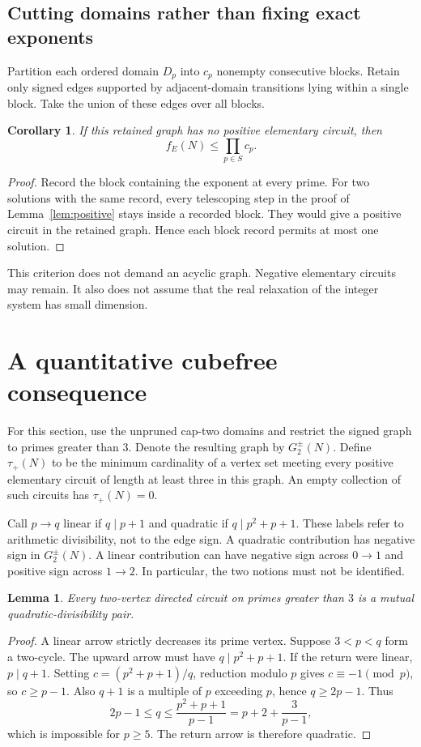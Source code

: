 \documentclass[11pt]{article}
\newtheorem{lemma}[theorem]{Lemma}
\newtheorem{corollary}[theorem]{Corollary}
\begin{document}
\subsection*{Cutting domains rather than fixing exact exponents}
Partition each ordered domain $D_p$ into $c_p$ nonempty consecutive blocks. Retain only signed edges supported by adjacent-domain transitions lying within a single block. Take the union of these edges over all blocks.

\begin{corollary}\label{cor:cuts}
If this retained graph has no positive elementary circuit, then
\[
 \boxed{f_E(N)\le\prod_{p\in S}c_p.}
\]
\end{corollary}
\begin{proof}
Record the block containing the exponent at every prime. For two solutions with the same record, every telescoping step in the proof of Lemma~\ref{lem:positive} stays inside a recorded block. They would give a positive circuit in the retained graph. Hence each block record permits at most one solution.
\end{proof}

This criterion does not demand an acyclic graph. Negative elementary circuits may remain. It also does not assume that the real relaxation of the integer system has small dimension.

\section{A quantitative cubefree consequence}
For this section, use the unpruned cap-two domains and restrict the signed graph to primes greater than $3$. Denote the resulting graph by $G_2^\pm(N)$. Define $\tau_+(N)$ to be the minimum cardinality of a vertex set meeting every positive elementary circuit of length at least three in this graph. An empty collection of such circuits has $\tau_+(N)=0$.

Call $p\to q$ linear if $q\mid p+1$ and quadratic if $q\mid p^2+p+1$. These labels refer to arithmetic divisibility, not to the edge sign. A quadratic contribution has negative sign in $G_2^\pm(N)$. A linear contribution can have negative sign across $0\to1$ and positive sign across $1\to2$. In particular, the two notions must not be identified.

\begin{lemma}\label{lem:mixed}
Every two-vertex directed circuit on primes greater than $3$ is a mutual quadratic-divisibility pair.
\end{lemma}
\begin{proof}
A linear arrow strictly decreases its prime vertex. Suppose $3<p<q$ form a two-cycle. The upward arrow must have $q\mid p^2+p+1$. If the return were linear, $p\mid q+1$. Setting $c=(p^2+p+1)/q$, reduction modulo $p$ gives $c\equiv-1\pmod p$, so $c\ge p-1$. Also $q+1$ is a multiple of $p$ exceeding $p$, hence $q\ge2p-1$. Thus
\[
 2p-1\le q\le\frac{p^2+p+1}{p-1}=p+2+\frac3{p-1},
\]
which is impossible for $p\ge5$. The return arrow is therefore quadratic.
\end{proof}
\end{document}
